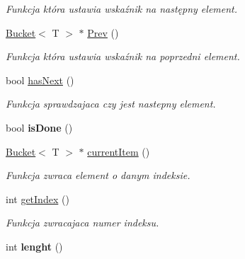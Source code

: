 \begin{DoxyCompactItemize}
\begin{DoxyCompactList}\small\item\em Funkcja która ustawia wskaźnik na następny element. \end{DoxyCompactList}\item 
\hyperlink{struct_bucket}{Bucket}$<$ T $>$ $\ast$ \hyperlink{class_list_iterator_ab7fe8d2983f4e8b2e2fd3bd4aef07b29}{Prev} ()\hypertarget{class_list_iterator_ab7fe8d2983f4e8b2e2fd3bd4aef07b29}{}\label{class_list_iterator_ab7fe8d2983f4e8b2e2fd3bd4aef07b29}

\begin{DoxyCompactList}\small\item\em Funkcja która ustawia wskaźnik na poprzedni element. \end{DoxyCompactList}\item 
bool \hyperlink{class_list_iterator_a4867ae53f21913ce8ac15b43b80eecdf}{has\+Next} ()\hypertarget{class_list_iterator_a4867ae53f21913ce8ac15b43b80eecdf}{}\label{class_list_iterator_a4867ae53f21913ce8ac15b43b80eecdf}

\begin{DoxyCompactList}\small\item\em Funkcja sprawdzajaca czy jest nastepny element. \end{DoxyCompactList}\item 
bool {\bfseries is\+Done} ()\hypertarget{class_list_iterator_aca4225823991119244be5f243593e333}{}\label{class_list_iterator_aca4225823991119244be5f243593e333}

\item 
\hyperlink{struct_bucket}{Bucket}$<$ T $>$ $\ast$ \hyperlink{class_list_iterator_a1dc25472c0e87a568b052c59e3b3d547}{current\+Item} ()\hypertarget{class_list_iterator_a1dc25472c0e87a568b052c59e3b3d547}{}\label{class_list_iterator_a1dc25472c0e87a568b052c59e3b3d547}

\begin{DoxyCompactList}\small\item\em Funkcja zwraca element o danym indeksie. \end{DoxyCompactList}\item 
int \hyperlink{class_list_iterator_a13e86a36987dc950f17b3770164afdd2}{get\+Index} ()\hypertarget{class_list_iterator_a13e86a36987dc950f17b3770164afdd2}{}\label{class_list_iterator_a13e86a36987dc950f17b3770164afdd2}

\begin{DoxyCompactList}\small\item\em Funkcja zwracajaca numer indeksu. \end{DoxyCompactList}\item 
int {\bfseries lenght} ()\hypertarget{class_list_iterator_a0ec248409282c2bc3bc1723c2c23dc5c}{}\label{class_list_iterator_a0ec248409282c2bc3bc1723c2c23dc5c}


\end{DoxyCompactItemize}
